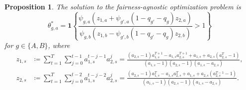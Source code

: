 \documentclass[letterpaper]{article} %
\newtheorem{proposition}{Proposition}
\begin{document}

\begin{proposition}
\label{prop:unconstrained_optimization_old}
The solution to the fairness-agnostic optimization problem is
\begin{equation*}
\theta^*_{g,a} = \mathbf{1} \left\{ \frac{\psi_{g,a} (z_{1,a} + \psi_{g',a}(1-q_{g'}-q_g) z_{2,a})}{\psi_{g,b} (z_{1,b} - \psi_{g',b}(1-q_{g'}-q_g) z_{2,b})} >1 \right\}
\end{equation*}
for $g \in \{A,B\}$, where
\begin{align*}
    z_{1,s} &\coloneqq \sum_{t=1}^T \sum_{j=0}^{t-1} a_{1,s}^{t-j-1} a_{2,s}^j = \frac{(a_{2,s} -1) a_{1,s}^{T+1} - a_{1,s} a_{2,s}^{T+1} + a_{1,s} + a_{2,s}(a_{2,s}^T -1)}{(a_{1,s} -1) (a_{2,s} -1) (a_{1,s} - a_{2,s})},\\
    z_{2,s} &\coloneqq \sum_{t=1}^T \sum_{j=0}^{t-2} a_{1,s}^{t-j-2} a_{2,s}^j = \frac{(a_{2,s} -1) a_{1,s}^{T} - a_{1,s} a_{2,s}^{T} + a_{1,s} + a_{2,s}(a_{2,s}^{T-1} -1)}{(a_{1,s} -1) (a_{2,s} -1) (a_{1,s} - a_{2,s})}.
\end{align*}
\end{proposition}
\end{document}
